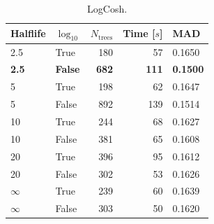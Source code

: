 \documentclass[a4paper, twoside]{tufte-book}
\begin{document}
  \begin{table}[]
  \begin{tabular}{@{}llrrl@{}}
    \toprule
  Halflife & $\log_{10}$ & $N_\mathrm{trees}$ & Time [$s$]   & MAD    \\ \midrule
  2.5 & True & 180 & 57  & 0.1650  \\
  \textbf{2.5} & \textbf{False} & \textbf{682} & \textbf{111} & \textbf{0.1500}   \\
  5   & True & 198 & 62  & 0.1647 \\
  5   & False & 892 & 139 & 0.1514 \\
  10  & True & 244 & 68  & 0.1627 \\
  10  & False & 381 & 65  & 0.1608 \\
  20  & True & 396 & 95  & 0.1612 \\
  20  & False & 302 & 53   & 0.1626 \\
  $\infty$   & True & 239 & 60  & 0.1639 \\
  $\infty$   & False & 303 & 50   & 0.1620  \\ \bottomrule
  \end{tabular}
  \caption{\label{tab:h:HPO_initial_LogCosh}LogCosh.}
  \end{table}
  
  
\end{document}
